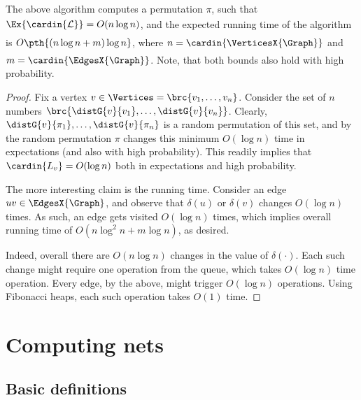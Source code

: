 \begin{lemma}
    The above algorithm computes a permutation $\pi$, such that
    $\Ex{\Bigl.\cardin{\mathcal{L}}} = O(n \log n)$, and the expected
    running time of the algorithm is
    $O\pth{\Bigl. (n\log n + m) \log n}$, where
    $n = \cardin{\VerticesX{\Graph}}$ and
    $m =\cardin{\EdgesX{\Graph}}$.  Note, that both bounds also hold
    with high probability.
\end{lemma}

\begin{proof}
    Fix a vertex $v \in \Vertices = \brc{v_1,\ldots, v_n}$.  Consider
    the set of $n$ numbers $\brc{\distG{v}{v_1}, \ldots,
       \distG{v}{v_n}}$. Clearly, $\distG{v}{\pi_1}, \ldots,
    \distG{v}{\pi_n}$ is a random permutation of this set, and 
    by  the random permutation $\pi$ changes this
    minimum $O(\log n)$ time in expectations (and also with high
    probability). This readily implies that $\cardin{L_v} = O(\log n)$
    both in expectations and high probability.
    
    The more interesting claim is the running time. Consider an edge
    $uv \in \EdgesX{\Graph}$, and observe that $\delta(u)$ or
    $\delta(v)$ changes $O( \log n)$ times. As such, an edge gets
    visited $O( \log n)$ times, which implies overall running time of
    $O( n \log^2 n + m \log n)$, as desired. 

    Indeed, overall there are $O(n \log n)$ changes in the value of
    $\delta(\cdot)$. Each such change might require one
     operation from the queue, which takes
    $O(\log n)$ time operation. Every edge, by the above, might
    trigger $O( \log n)$  operations. Using
    Fibonacci heaps, each such operation takes $O(1)$ time.
\end{proof}


\section{Computing nets}

\subsection{Basic definitions}


